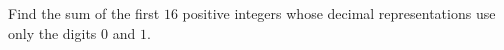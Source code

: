 Find the sum of the first $16$ positive integers whose decimal representations use only the digits $0$ and $1$.
